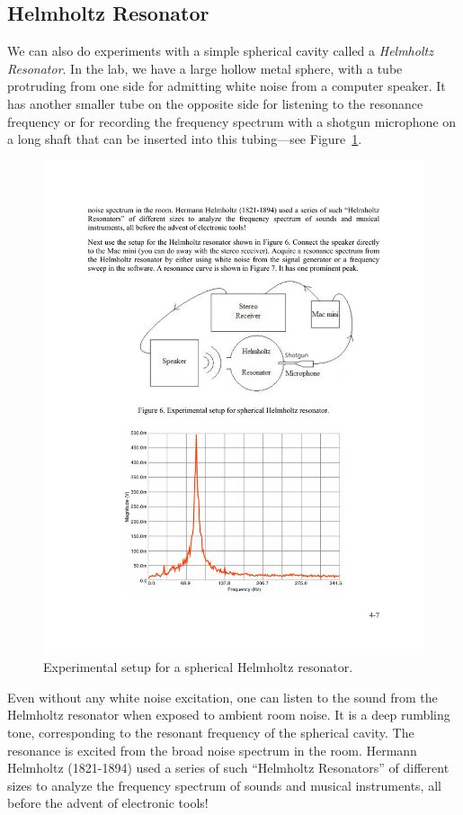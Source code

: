 \documentclass[11pt]{NSF}
\begin{document}
\subsection{Helmholtz Resonator}

We can also do experiments with a simple spherical cavity 
called a {\em Helmholtz Resonator}. 
In the lab, 
we have a large hollow metal sphere, with a tube protruding 
from one side for admitting white noise from a computer speaker. 
It has another smaller tube on the opposite side for 
listening to the resonance frequency or for recording the 
frequency spectrum with a shotgun microphone on a long shaft 
that can be inserted into this tubing---see Figure~\ref{f:6}.
%
\begin{figure}[hbtp]
\begin{center}
\includegraphics[width=.65\textwidth]{fig4_6}
\caption{Experimental setup for a spherical Helmholtz resonator.}
\label{f:6} 
\end{center} 
\end{figure}
%

Even without any white noise excitation, one can listen to 
the sound from the Helmholtz resonator when exposed to ambient 
room noise.
It is a deep rumbling tone, corresponding to the resonant 
frequency of the spherical cavity. 
The resonance is excited from the broad noise spectrum in the room. 
Hermann Helmholtz (1821-1894) used a series of such 
``Helmholtz Resonators” of different sizes to analyze the 
frequency spectrum of sounds and musical instruments, 
all before the advent of electronic tools!
\end{document}
